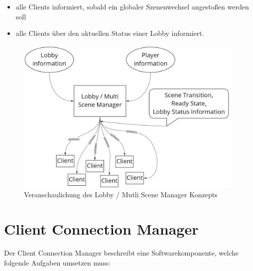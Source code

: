 \begin{itemize}
	\item alle Clients informiert, sobald ein globaler Szenenwechsel angestoßen werden soll
	\item alle Clients über den aktuellen Status einer Lobby informiert.
\end{itemize}

\begin{figure}[H]
	\centering
	\includegraphics[width=110mm]{images/Lobby_Multi_Scene_Manager.jpg}
	\caption[Lobby / Mutli Scene Manager Diagramm]{Veranschaulichung des Lobby / Mutli Scene Manager Konzepts}
	\label{pic:Lobby_Multi_Scene_Manager}
\end{figure}


\section{Client Connection Manager}

Der Client Connection Manager beschreibt eine Softwarekomponente, welche folgende Aufgaben umsetzen muss:

